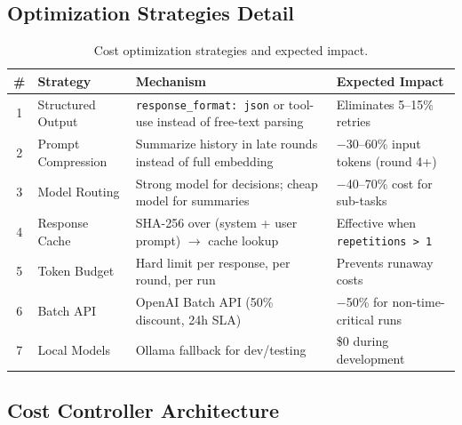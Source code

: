 \documentclass[12pt, a4paper]{article}
\begin{document}
\subsection{Optimization Strategies Detail}

\begin{table}[H]
\centering
\small
\begin{tabularx}{\textwidth}{clXl}
    \toprule
    \textbf{\#} & \textbf{Strategy} & \textbf{Mechanism} & \textbf{Expected Impact} \\
    \midrule
    1 & Structured Output &
        \texttt{response\_format: json} or tool-use instead of free-text parsing &
        Eliminates 5--15\% retries \\
    2 & Prompt Compression &
        Summarize history in late rounds instead of full embedding &
        $-$30--60\% input tokens (round 4+) \\
    3 & Model Routing &
        Strong model for decisions; cheap model for summaries &
        $-$40--70\% cost for sub-tasks \\
    4 & Response Cache &
        SHA-256 over (system + user prompt) $\to$ cache lookup &
        Effective when \texttt{repetitions > 1} \\
    5 & Token Budget &
        Hard limit per response, per round, per run &
        Prevents runaway costs \\
    6 & Batch API &
        OpenAI Batch API (50\% discount, 24h SLA) &
        $-$50\% for non-time-critical runs \\
    7 & Local Models &
        Ollama fallback for dev/testing &
        \$0 during development \\
    \bottomrule
\end{tabularx}
\caption{Cost optimization strategies and expected impact.}
\label{tab:cost-strategies}
\end{table}

\subsection{Cost Controller Architecture}
\end{document}
